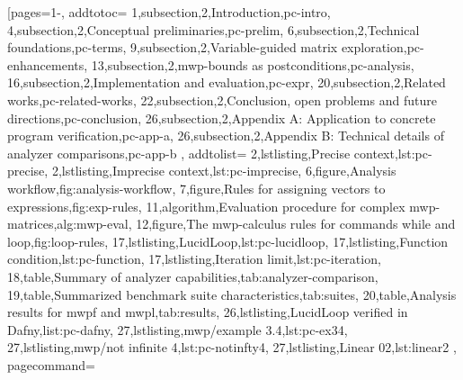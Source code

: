 \pageIconFm
{}
[pages={1-},
    addtotoc={
        1,subsection,2,{Introduction},pc-intro,
        4,subsection,2,{Conceptual preliminaries},pc-prelim,
        6,subsection,2,{Technical foundations},pc-terms,
        9,subsection,2,{Variable-guided matrix exploration},pc-enhancements,
        13,subsection,2,{mwp-bounds as postconditions},pc-analysis,
        16,subsection,2,{Implementation and evaluation},pc-expr,
        20,subsection,2,{Related works},pc-related-works,
        22,subsection,2,{Conclusion, open problems and future directions},pc-conclusion,
        26,subsection,2,{Appendix A: Application to concrete program verification},pc-app-a,
        26,subsection,2,{Appendix B: Technical details of analyzer comparisons},pc-app-b
    }, addtolist={
        2,lstlisting,{Precise context},lst:pc-precise,
        2,lstlisting,{Imprecise context},lst:pc-imprecise,
        6,figure,{Analysis workflow},fig:analysis-workflow,
        7,figure,{Rules for assigning vectors to expressions},fig:exp-rules,
        11,algorithm,{Evaluation procedure for complex mwp-matrices},alg:mwp-eval,
        12,figure,{The mwp-calculus rules for commands while and loop},fig:loop-rules,
        17,lstlisting,{LucidLoop},lst:pc-lucidloop,
        17,lstlisting,{Function condition},lst:pc-function,
        17,lstlisting,{Iteration limit},lst:pc-iteration,
        18,table,{Summary of analyzer capabilities},tab:analyzer-comparison,
        19,table,{Summarized benchmark suite characteristics},tab:suites,
        20,table,{Analysis results for mwpf and mwpl},tab:results,
        26,lstlisting,{LucidLoop verified in Dafny},list:pc-dafny,
        27,lstlisting,{mwp/example 3.4},lst:pc-ex34,
        27,lstlisting,{mwp/not infinite 4},lst:pc-notinfty4,
        27,lstlisting,{Linear 02},lst:linear2
    }, pagecommand={\thispagestyle{empty}%
}
